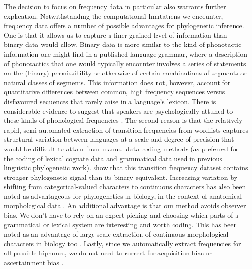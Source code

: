 The decision to focus on frequency data in particular also warrants further explication. Notwithstanding the computational limitations we encounter, frequency data offers a number of possible advantages for phylogenetic inference. One is that it allows us to capture a finer grained level of information than binary data would allow. Binary data is more similar to the kind of phonotactic information one might find in a published language grammar, where a description of phonotactics that one would typically encounter involves a series of statements on the (binary) permissibility or otherwise of certain combinations of segments or natural classes of segments. This information does not, however, account for quantitative differences between common, high frequency sequences versus disfavoured sequences that rarely arise in a language's lexicon. There is considerable evidence to suggest that speakers are psychologically attuned to these kinds of phonological frequencies \autocites{coleman_stochastic_1997}{zuraw_patterned_2000}{ernestus_predicting_2003}{albright_rules_2003}{eddington_spanish_2004}{hayes_stochastic_2006}{gordon_phonological_2016}. The second reason is that the relatively rapid, semi-automated extraction of transition frequencies from wordlists captures structural variation between languages at a scale and degree of precision that would be difficult to attain from manual data coding methods (as preferred for the coding of lexical cognate data and grammatical data used in previous linguistic phylogenetic work). \textcite{macklin-cordes_phylogenetic_2020} show that this transition frequency dataset contains stronger phylogenetic signal than its binary equivalent. Increasing variation by shifting from categorical-valued characters to continuous characters has also been noted as advantageous for phylogenetics in biology, in the context of anatomical morphological data \autocites{parins-fukuchi_use_2018}{wright_systematists_2019}. An additional advantage is that our method avoids observer bias. We don't have to rely on an expert picking and choosing which parts of a grammatical or lexical system are interesting and worth coding. This has been noted as an advantage of large-scale extraction of continuous morphological characters in biology too \autocite{wright_systematists_2019}. Lastly, since we automatically extract frequencies for all possible biphones, we do not need to correct for acquisition bias or ascertainment bias \autocite{leache_short_2015}.

